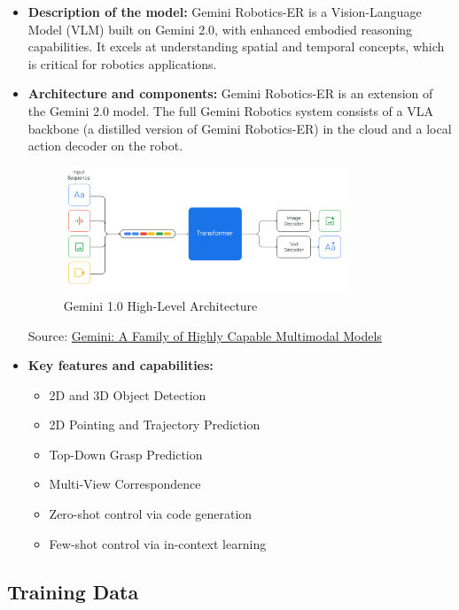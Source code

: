 \documentclass[12pt,a4paper]{article}
\begin{document}
\begin{itemize}
    \item \textbf{Description of the model:} Gemini Robotics-ER is a Vision-Language Model (VLM) built on Gemini 2.0, with enhanced embodied reasoning capabilities. It excels at understanding spatial and temporal concepts, which is critical for robotics applications.

    \item \textbf{Architecture and components:} Gemini Robotics-ER is an extension of the Gemini 2.0 model. The full Gemini Robotics system consists of a VLA backbone (a distilled version of Gemini Robotics-ER) in the cloud and a local action decoder on the robot.

    \begin{figure}[h]
        \centering
        \includegraphics[width=0.8\textwidth]{../reading/keypoints/figures/tech_fig_architecture.png}
        \caption{Gemini 1.0 High-Level Architecture}
        \label{fig:gemini-architecture}
    \end{figure}
    Source: \href{https://arxiv.org/abs/2312.11805}{Gemini: A Family of Highly Capable Multimodal Models}

    \item \textbf{Key features and capabilities:}
    \begin{itemize}
        \item 2D and 3D Object Detection
        \item 2D Pointing and Trajectory Prediction
        \item Top-Down Grasp Prediction
        \item Multi-View Correspondence
        \item Zero-shot control via code generation
        \item Few-shot control via in-context learning
    \end{itemize}
\end{itemize}

\subsection{Training Data}
\end{document}
